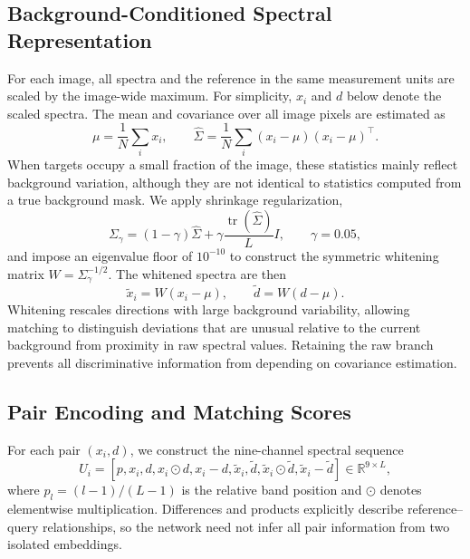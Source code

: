 \documentclass[a4paper,11pt]{article}
\newcommand{\R}{\mathbb{R}}
\begin{document}
\subsection{Background-Conditioned Spectral Representation}
For each image, all spectra and the reference in the same measurement units are scaled by the image-wide maximum. For simplicity, $x_i$ and $d$ below denote the scaled spectra. The mean and covariance over all image pixels are estimated as
\begin{equation}
\mu=\frac{1}{N}\sum_i x_i,\qquad
\widehat\Sigma=\frac{1}{N}\sum_i(x_i-\mu)(x_i-\mu)^\top.
\end{equation}
When targets occupy a small fraction of the image, these statistics mainly reflect background variation, although they are not identical to statistics computed from a true background mask. We apply shrinkage regularization,
\begin{equation}
\Sigma_\gamma=(1-\gamma)\widehat\Sigma+\gamma\frac{\operatorname{tr}(\widehat\Sigma)}{L}I,
\qquad \gamma=0.05,
\end{equation}
and impose an eigenvalue floor of $10^{-10}$ to construct the symmetric whitening matrix $W=\Sigma_\gamma^{-1/2}$. The whitened spectra are then
\begin{equation}
\widetilde x_i=W(x_i-\mu),\qquad \widetilde d=W(d-\mu).
\end{equation}
Whitening rescales directions with large background variability, allowing matching to distinguish deviations that are unusual relative to the current background from proximity in raw spectral values. Retaining the raw branch prevents all discriminative information from depending on covariance estimation.

\subsection{Pair Encoding and Matching Scores}
For each pair $(x_i,d)$, we construct the nine-channel spectral sequence
\begin{equation}
U_i=\left[p,x_i,d,x_i\odot d,x_i-d,
\widetilde x_i,\widetilde d,\widetilde x_i\odot\widetilde d,
\widetilde x_i-\widetilde d\right]\in\R^{9\times L},
\end{equation}
where $p_l=(l-1)/(L-1)$ is the relative band position and $\odot$ denotes elementwise multiplication. Differences and products explicitly describe reference--query relationships, so the network need not infer all pair information from two isolated embeddings.
\end{document}
